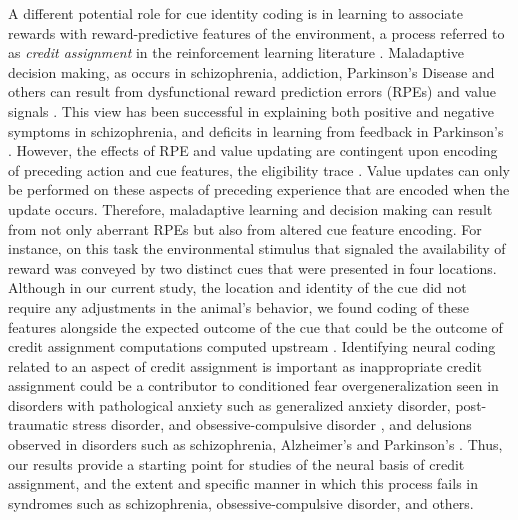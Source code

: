 \documentclass[11pt]{article}
\let\cite=\citep
\providecommand{\DIFadd}[1]{{\protect\color{red} \sf #1}} %
\providecommand{\DIFdel}[1]{} %
\providecommand{\DIFaddbegin}{} %
\providecommand{\DIFaddend}{} %
\providecommand{\DIFdelbegin}{} %
\providecommand{\DIFdelend}{} %
\newcommand{\DIFscaledelfig}{0.5}
\newlength{\DIFdelgraphicswidth} %
\newlength{\DIFdelgraphicsheight} %
\newcommand{\DIFaddincludegraphics}[2][]{{\color{red}\fbox{\DIFOincludegraphics[#1]{#2}}}} %
\newcommand{\DIFdelincludegraphics}[2][]{%
\sbox{\DIFdelgraphicsbox}{\DIFOincludegraphics[#1]{#2}}%
\settoboxwidth{\DIFdelgraphicswidth}{\DIFdelgraphicsbox} %
\settoboxtotalheight{\DIFdelgraphicsheight}{\DIFdelgraphicsbox} %
\scalebox{\DIFscaledelfig}{%
\parbox[b]{\DIFdelgraphicswidth}{\usebox{\DIFdelgraphicsbox}\\[-\baselineskip] \rule{\DIFdelgraphicswidth}{0em}}\llap{\resizebox{\DIFdelgraphicswidth}{\DIFdelgraphicsheight}{%
\setlength{\unitlength}{\DIFdelgraphicswidth}%
\begin{picture}(1,1)%
\thicklines\linethickness{2pt} %
{\color[rgb]{1,0,0}\put(0,0){\framebox(1,1){}}}%
{\color[rgb]{1,0,0}\put(0,0){\line( 1,1){1}}}%
{\color[rgb]{1,0,0}\put(0,1){\line(1,-1){1}}}%
\end{picture}%
}\hspace*{3pt}}} %
} %
\DeclareRobustCommand{\DIFaddbegin}{\DIFOaddbegin \let\includegraphics\DIFaddincludegraphics} %
\DeclareRobustCommand{\DIFaddend}{\DIFOaddend \let\includegraphics\DIFOincludegraphics} %
\DeclareRobustCommand{\DIFdelbegin}{\DIFOdelbegin \let\includegraphics\DIFdelincludegraphics} %
\DeclareRobustCommand{\DIFdelend}{\DIFOaddend \let\includegraphics\DIFOincludegraphics} %
\begin{document}
\DIFadd{A different potential role for cue identity coding is in learning to
associate rewards with reward-predictive features of the environment,
a process referred to as }{\it \DIFadd{credit assignment}} \DIFadd{in the reinforcement
learning literature \cite{sutton1998}. }\DIFaddend Maladaptive decision making, as
occurs in schizophrenia, addiction, Parkinson's \DIFdelbegin \DIFdel{, among others , }\DIFdelend \DIFaddbegin \DIFadd{Disease and others }\DIFaddend can
result from dysfunctional \DIFdelbegin \DIFdel{RPE }\DIFdelend \DIFaddbegin \DIFadd{reward prediction errors (RPEs) }\DIFaddend and value
signals \cite{Frank2004,Gradin2011,Maia2011}. This view has been
successful in explaining both positive and negative symptoms in
schizophrenia, and deficits in learning from feedback in Parkinson's
\cite{Frank2004,Gradin2011}. However, the effects of RPE and value
updating are contingent upon encoding of preceding action and cue
features, the eligibility trace \cite{sutton1998,Lee2012}. Value
updates can only be performed on these aspects of preceding experience
that are encoded when the update occurs. Therefore, maladaptive
learning and decision making can result from not only aberrant RPEs
but also from altered cue feature encoding. For instance, on this task
the environmental stimulus that signaled the availability of reward
was conveyed by two distinct cues that were presented in four
locations. \DIFdelbegin \DIFdel{While }\DIFdelend \DIFaddbegin \DIFadd{Although }\DIFaddend in our current study, the location and identity of
the cue did not require any adjustments in the animal’s behavior, we
found coding of these features alongside the expected outcome of the
cue that could be the outcome of credit assignment computations
computed upstream
\DIFaddbegin \DIFadd{\cite{Chau2015,Akaishi2016,Asaad2017,Noonan2017}}\DIFaddend . Identifying neural
coding related to an aspect of credit assignment is important as
inappropriate credit assignment could be a contributor to conditioned
fear overgeneralization seen in disorders with pathological anxiety
such as generalized anxiety disorder, \DIFdelbegin \DIFdel{post traumatic }\DIFdelend \DIFaddbegin \DIFadd{post-traumatic }\DIFaddend stress disorder,
and obsessive-compulsive disorder
\cite{Kaczkurkin2013,Lissek2014,Kaczkurkin2017}, and delusions
observed in disorders such as schizophrenia, Alzheimer's and
Parkinson's \cite{Kapur2003,Corlett2010}. Thus, our results provide a
\DIFdelbegin \DIFdel{neural window into the process }\DIFdelend \DIFaddbegin \DIFadd{starting point for studies of the neural basis }\DIFaddend of credit assignment,
\DIFdelbegin \DIFdel{such that }\DIFdelend \DIFaddbegin \DIFadd{and }\DIFaddend the extent and specific manner in which this process fails in
syndromes such as schizophrenia, obsessive-compulsive disorder, \DIFdelbegin \DIFdel{etc.
\ can be experimentally accessed.
}\DIFdelend \DIFaddbegin \DIFadd{and
others.
}\DIFaddend 
\end{document}
